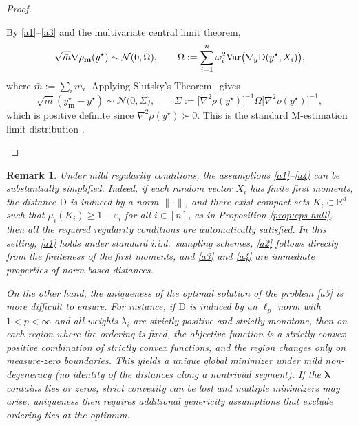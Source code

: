 \documentclass[letter,11pt, reqno]{amsart}
\newcommand{\R}{\mathbb{R}}
\newcommand{\D}{\mathrm{D}}
\renewcommand{\;}{\quad}
\theoremstyle{thmstyleone}%
\theoremstyle{thmstyletwo}%
\newtheorem{remark}{Remark}%
\theoremstyle{thmstylethree}%
\begin{document}
\begin{proof}
\begin{enumerate}
By \ref{a1}--\ref{a3} and the multivariate central limit theorem,
\begin{equation*}
    \sqrt{\bar m}\nabla\rho_{\mathbf m}(y^\star)
\sim
\mathcal N(0,\Omega),
\qquad 
\Omega := \sum_{i=1}^n \omega_i^2{\rm Var}\big(\nabla_y\D(y^\star,X_i)\big),
\end{equation*}
where $\bar m:=\sum_i m_i$.
Applying Slutsky’s Theorem~\citep[see, e.g.][]{goldberger1970econometric} gives
\begin{equation*}
    \sqrt{\bar m}(y^\star_{\mathbf m}-y^\star)
\sim
\mathcal N\big(0,\Sigma\big),
\qquad 
\Sigma := \big[\nabla^2\rho(y^\star)\big]^{-1}\Omega\big[\nabla^2\rho(y^\star)\big]^{-1},
\end{equation*}
which is positive definite since $\nabla^2\rho(y^\star)\succ0$.
This is the standard M-estimation limit distribution
\citep[see, e.g.,][]{ShapiroDentchevaRuszczynski2014}.
\end{enumerate}
\end{proof}
\begin{remark}
Under mild regularity conditions, the assumptions \ref{a1}--\ref{a4} can be substantially simplified. Indeed, if each random vector $X_i$ has finite first moments, the distance $\D$ is induced by a norm $\|\cdot\|$, and there exist compact sets $K_i\subset\R^d$ such that $\mu_i(K_i)\ge 1-\varepsilon_i$ for all $i\in[n]$, as in Proposition \ref{prop:eps-hull}, then all the required regularity conditions are automatically satisfied. In this setting, \ref{a1} holds under standard i.i.d.\ sampling schemes, \ref{a2} follows directly from the finiteness of the first moments, and \ref{a3} and \ref{a4} are immediate properties of norm-based distances.

On the other hand, the uniqueness of the optimal solution of the problem \ref{a5} is more difficult to ensure. For instance, if $\D$ is induced by an $\ell_p$ norm with $1<p<\infty$ and all weights $\lambda_i$ are strictly positive and \emph{strictly monotone}, then on each region where the ordering is fixed, the objective function is a strictly convex positive combination of strictly convex functions, and the region changes only on measure-zero boundaries. This yields a \emph{unique} global minimizer under mild non-degeneracy (no identity of the distances along a nontrivial segment). If the $\bm \lambda$ contains ties or zeros, strict convexity can be lost and multiple minimizers may arise, uniqueness then requires additional genericity assumptions that exclude ordering ties at the optimum. 
\end{remark}
\end{document}
